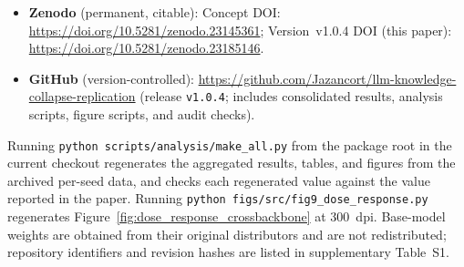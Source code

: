 \documentclass[a4paper,fleqn]{cas-dc}
\newif\ifshowchanges
\newcommand{\rev}[1]{\ifshowchanges{\color{blue}#1}\else{#1}\fi}
\begin{document}
\begin{itemize}
  \setlength{\itemsep}{0pt}\setlength{\parskip}{0pt}
  \item \textbf{Zenodo} (permanent, citable):
    Concept DOI: \url{https://doi.org/10.5281/zenodo.23145361};
    Version~v1.0.4 DOI (this paper): \url{https://doi.org/10.5281/zenodo.23185146}.
  \item \textbf{GitHub} (version-controlled):
    \url{https://github.com/Jazancort/llm-knowledge-collapse-replication}
    (release \texttt{v1.0.4}; includes consolidated results, analysis scripts, figure scripts, and audit checks).
\end{itemize}

\rev{Running \texttt{python scripts/analysis/}\allowbreak\texttt{make\_all.py} from the package root in the current checkout regenerates the aggregated results, tables, and figures from the archived per-seed data, and checks each regenerated value against the value reported in the paper.}
Running \texttt{python figs/src/}\allowbreak\texttt{fig9\_dose\_response.py} regenerates
Figure~\ref{fig:dose_response_crossbackbone} at 300~dpi.
Base-model weights are obtained from their original distributors and are not
redistributed; repository identifiers and revision hashes are listed in supplementary
Table~S1.

\clearpage
\def\lastpage{\pageref{LastPage}}
\end{document}
